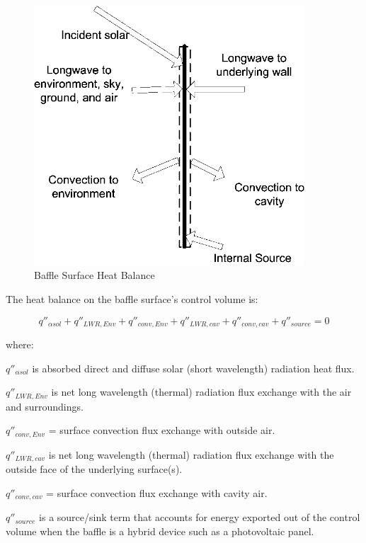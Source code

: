 \begin{figure}[hbtp] %
\centering
\includegraphics[width=0.9\textwidth, height=0.9\textheight, keepaspectratio=true]{media/image438.png}
\caption{Baffle Surface Heat Balance \protect \label{fig:baffle-surface-heat-balance}}
\end{figure}

The heat balance on the baffle surface's control volume is:

\begin{equation}
{q''_{\alpha sol}} + {q''_{LWR,Env}} + {q''_{conv,Env}} + {q''_{LWR,cav}} + {q''_{conv,cav}} + {q''_{source}} = 0
\label{eq:BaffleSurfaceCVHeatBalance}
\end{equation}

where: 

\(q''_{\alpha sol}\) is absorbed direct and diffuse solar (short wavelength) radiation heat flux.

\(q''_{LWR,Env}\) is net long wavelength (thermal) radiation flux exchange with the air and surroundings.

\(q''_{conv,Env}\) = surface convection flux exchange with outside air.

\(q''_{LWR,cav}\) is net long wavelength (thermal) radiation flux exchange with the outside face of the underlying surface(s).

\(q''_{conv,cav}\) = surface convection flux exchange with cavity air.

\({q''_{source}}\) is a source/sink term that accounts for energy exported out of the control volume when the baffle is a hybrid device such as a photovoltaic panel.

